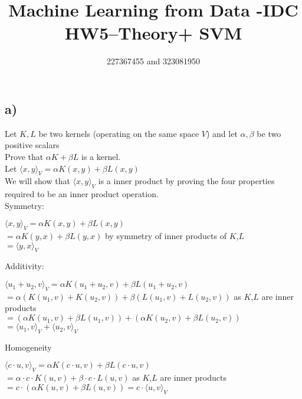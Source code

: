 \documentclass[12pt]{article}
\title{Machine Learning from Data -IDC\\HW5–Theory+ SVM}
\author{227367455 and 323081950}
\newcommand\tab[1][1cm]{\hspace*{#1}}
\begin{document}
\maketitle

\section*{}

\subsection*{a)}

Let $K,L$ be two kernels (operating on the same space $V$) and let $ \alpha, \beta $ be two positive scalars \\
\tab Prove that $\alpha K + \beta L $ is a kernel.\\

Let $\langle x,y \rangle_V = \alpha K(x,y) + \beta L(x,y) $ \\
We will show that $ \langle x,y \rangle_V $ is a inner product by proving the four properties required to be an inner product operation. \\

\tab Symmetry:

$ \langle x,y \rangle_V = \alpha K(x,y) + \beta L(x,y) $ \\
$ = \alpha K(y,x) + \beta L(y,x) $ by symmetry of inner products of $K$,$L$ \\
$ = \langle y,x \rangle_V $
		
\tab Additivity:

$ \langle u_1 + u_2, v \rangle_V = \alpha K(u_1 + u_2, v) + \beta L(u_1 + u_2, v) $ \\
$ = \alpha (K(u_1, v) + K(u_2, v)) + \beta (L(u_1, v) + L(u_2, v)) $ as $K$,$L$ are inner products \\
$ = (\alpha K(u_1, v) + \beta L(u_1, v)) + (\alpha K(u_2, v) + \beta L(u_2, v)) $ \\
$ = \langle u_1, v \rangle_V + \langle u_2, v \rangle_V $

\tab Homogeneity

$ \langle c\cdot u, v \rangle_V = \alpha K(c\cdot u, v) + \beta L(c\cdot u, v) $ \\
$ = \alpha \cdot c \cdot K(u, v) + \beta \cdot c \cdot L(u, v) $ as $K$,$L$ are inner products \\
$ = c\cdot (\alpha K(u, v) + \beta L(u, v))  = c \cdot \langle u, v \rangle_V $
\end{document}
